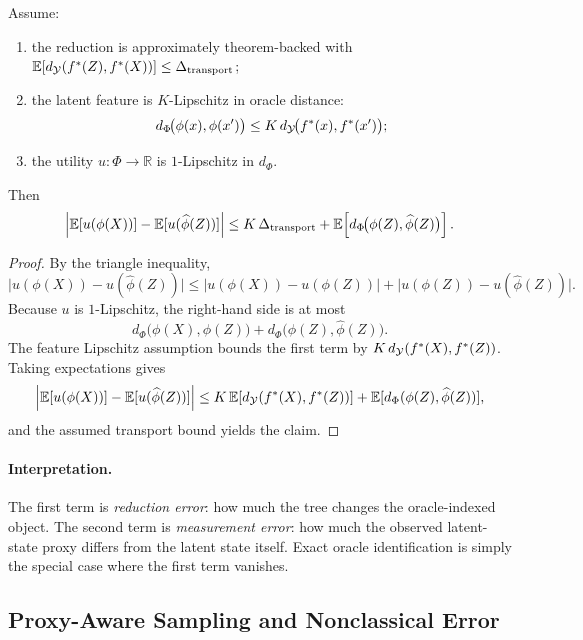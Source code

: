 \begin{proposition}
\label{prop:approx-transport-plus-measurement}
Assume:
\begin{enumerate}[nosep]
    \item the reduction is approximately theorem-backed with
    $\mathbb{E}[d_{\mathcal{Y}}(f^{\ast}(Z),f^{\ast}(X))]\le \Delta_{\mathrm{transport}}$;
    \item the latent feature is $K$-Lipschitz in oracle distance:
    \[
    d_{\Phi}\!\big(\phi(x),\phi(x')\big)\le
    K\,d_{\mathcal{Y}}\!\big(f^{\ast}(x),f^{\ast}(x')\big);
    \]
    \item the utility $u:\Phi\to\mathbb{R}$ is $1$-Lipschitz in $d_{\Phi}$.
\end{enumerate}
Then
\[
\left|
\mathbb{E}[u(\phi(X))] - \mathbb{E}[u(\widehat{\phi}(Z))]
\right|
\le
K\,\Delta_{\mathrm{transport}}
+
\mathbb{E}\!\left[d_{\Phi}\!\big(\phi(Z),\widehat{\phi}(Z)\big)\right].
\]
\end{proposition}

\begin{proof}
By the triangle inequality,
\[
\big|u(\phi(X)) - u(\widehat{\phi}(Z))\big|
\le
\big|u(\phi(X)) - u(\phi(Z))\big|
+
\big|u(\phi(Z)) - u(\widehat{\phi}(Z))\big|.
\]
Because $u$ is $1$-Lipschitz, the right-hand side is at most
\[
d_{\Phi}\!\big(\phi(X),\phi(Z)\big)
+
d_{\Phi}\!\big(\phi(Z),\widehat{\phi}(Z)\big).
\]
The feature Lipschitz assumption bounds the first term by
$K\,d_{\mathcal{Y}}(f^{\ast}(X),f^{\ast}(Z))$. Taking expectations gives
\[
\left|
\mathbb{E}[u(\phi(X))] - \mathbb{E}[u(\widehat{\phi}(Z))]
\right|
\le
K\,\mathbb{E}[d_{\mathcal{Y}}(f^{\ast}(X),f^{\ast}(Z))]
+
\mathbb{E}[d_{\Phi}(\phi(Z),\widehat{\phi}(Z))],
\]
and the assumed transport bound yields the claim.
\end{proof}

\paragraph{Interpretation.}
The first term is \emph{reduction error}: how much the tree changes the
oracle-indexed object. The second term is \emph{measurement error}: how much
the observed latent-state proxy differs from the latent state itself. Exact
oracle identification is simply the special case where the first term vanishes.

\subsection{Proxy-Aware Sampling and Nonclassical Error}


